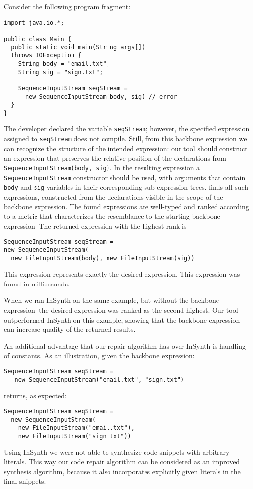 Consider the following program fragment:
\begin{lstlisting}
import java.io.*;

public class Main {
  public static void main(String args[]) 
  throws IOException {
    String body = "email.txt";
    String sig = "sign.txt";
    
    SequenceInputStream seqStream = 
      new SequenceInputStream(body, sig) // error
  }
} 
\end{lstlisting}
The developer declared the variable \lstinline{seqStream}; however, the specified 
expression assigned to \lstinline{seqStream} does not compile. Still, from this backbone expression 
we can recognize the structure of the intended expression: our tool should construct 
an expression that preserves the relative position of the declarations from 
\lstinline{SequenceInputStream(body, sig)}. In the resulting expression a \lstinline{SequenceInputStream} constructor
should be used, with arguments that contain \lstinline{body} and \lstinline{sig} variables in their
corresponding sub-expression trees. \ourTool finds all such expressions, 
constructed from the
declarations visible in the scope of the backbone expression. The found expressions are well-typed 
and ranked according to a metric that characterizes the
resemblance to the starting backbone expression.
The returned expression with the highest rank is
\begin{lstlisting}
SequenceInputStream seqStream = 
new SequenceInputStream(
  new FileInputStream(body), new FileInputStream(sig))
\end{lstlisting}
This expression represents exactly the desired expression. This expression was found 
in  milliseconds.
 
When we ran InSynth on the same example, but without the backbone expression, the desired expression was
ranked as the second highest. Our tool outperformed InSynth on this example, showing that the backbone expression can increase quality of the returned results.

An additional advantage that our repair algorithm has over InSynth is handling of constants. 
As an illustration, given the backbone expression:
\begin{lstlisting}
SequenceInputStream seqStream = 
   new SequenceInputStream("email.txt", "sign.txt") 
\end{lstlisting}
\ourTool returns, as expected:
\begin{lstlisting}
SequenceInputStream seqStream = 
  new SequenceInputStream(
    new FileInputStream("email.txt"), 
    new FileInputStream("sign.txt"))
\end{lstlisting}
Using InSynth we were not able to synthesize code snippets with arbitrary literals. 
This way our code repair algorithm can be considered as an improved synthesis algorithm,
because it also incorporates explicitly given literals in the final snippets.

